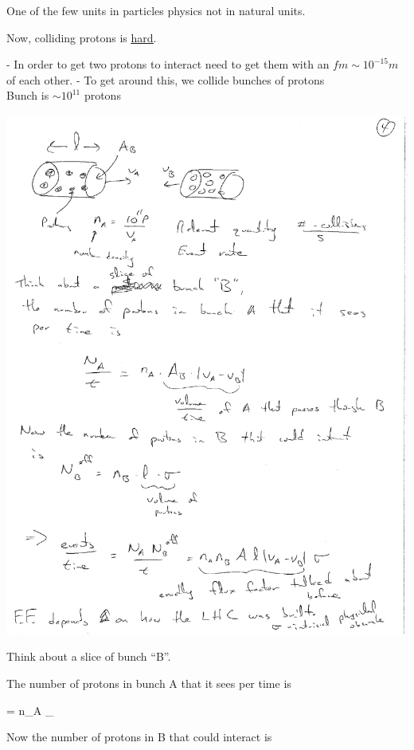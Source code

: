 {One of the few units in particles physics not in natural units.

\lineacross

Now, colliding protons is \underline{\underline{hard}}.

- In order to get two protons to interact need to get them with an $fm \sim 10^{-15}m$ of each other.
- To get around this, we collide bunches of protons \\
Bunch is $\sim 10^{11}$ protons 

\includegraphics[width=1.0\textwidth]{./bunches.pdf}



Think about a slice of bunch ``B''.

The number of protons in bunch A that it sees per time is 

\be
{} = n_A \cdot {}_{ }
\ee

Now the number of protons in B that could interact is 

}
